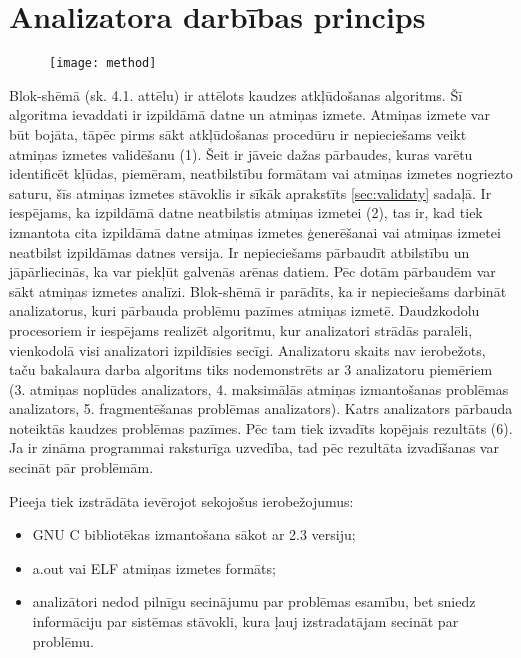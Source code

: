 ﻿\section{Analizatora darbības princips}

 \begin{figure}[h]
\begin{center}
\texttt{[image: method]}
\end{center}
\caption{\textbf{\fontsize{11}{12}\selectfont {Uz metodi balstītā algoritma blok-shēma}}}
\end{figure}

Blok-shēmā (sk. 4.1. attēlu) ir attēlots kaudzes atkļūdošanas algoritms.
Šī algoritma ievaddati ir izpildāmā datne un atmiņas izmete.
Atmiņas izmete var būt bojāta, tāpēc pirms sākt atkļūdošanas procedūru ir nepieciešams veikt atmiņas izmetes validēšanu (1).
Šeit ir jāveic dažas pārbaudes, kuras varētu identificēt kļūdas, piemēram, neatbilstību formātam vai atmiņas izmetes nogriezto saturu, šīs atmiņas izmetes stāvoklis ir sīkāk aprakstīts \ref{sec:validaty} sadaļā.
Ir iespējams, ka izpildāmā datne neatbilstis atmiņas izmetei (2), tas ir, kad tiek izmantota cita izpildāmā datne atmiņas izmetes ģenerēšanai vai atmiņas izmetei neatbilst izpildāmas datnes versija.
Ir nepieciešams pārbaudīt atbilstību un jāpārliecinās, ka var piekļūt galvenās arēnas datiem.
Pēc dotām pārbaudēm var sākt atmiņas izmetes analīzi.
Blok-shēmā ir parādīts, ka ir nepieciešams darbināt analizatorus, kuri  pārbauda problēmu pazīmes atmiņas izmetē.
Daudzkodolu procesoriem ir iespējams realizēt algoritmu, kur analizatori strādās paralēli, vienkodolā visi analizatori izpildīsies secīgi. 
Analizatoru skaits nav ierobežots, taču bakalaura darba algoritms tiks nodemonstrēts ar 3 analizatoru piemēriem (3. atmiņas noplūdes analizators, 4. maksimālās atmiņas izmantošanas problēmas analizators, 5. fragmentēšanas problēmas analizators). 
Katrs analizators pārbauda noteiktās kaudzes problēmas pazīmes. 
Pēc tam tiek izvadīts kopējais rezultāts (6).
Ja ir zināma programmai raksturīga uzvedība, tad pēc rezultāta izvadīšanas var secināt pār problēmām.

Pieeja tiek izstrādāta ievērojot sekojošus ierobežojumus: %
\begin{itemize}
	\item GNU C bibliotēkas izmantošana sākot ar 2.3 versiju;
    \item a.out vai ELF atmiņas izmetes formāts;
    \item analizātori nedod pilnīgu secinājumu par problēmas esamību, bet sniedz informāciju par sistēmas stāvokli, kura ļauj izstradatājam secināt par problēmu.
\end{itemize} 



